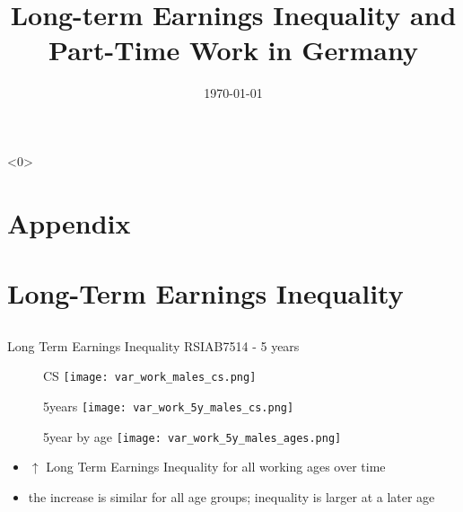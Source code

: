 \documentclass[hyperref={bookmarks=false}]{beamer}
\title{Long-term Earnings Inequality and Part-Time Work in Germany}
\author[Short Name (U ABC)]{%
  \texorpdfstring{%
    \begin{columns}
      \column{.5\linewidth}
      \centering
Manuel Sanchez
    \end{columns}
 }
{Author 1}
}
\institute{University of Bristol}
\date{\today}
\let\oldcite=\cite
\renewcommand{\cite}[1]{\textcolor[rgb]{.0,.2,.7}{\oldcite{#1}}}
\begin{document}
\begin{frame}
\titlepage
\end{frame}



\begin{frame}<0>
\addtocounter{framenumber}{-1} 
\scriptsize


\end{frame}

\begin{appendix}

\section{Appendix}
\subsection{}


\section{Long-Term Earnings Inequality}
\subsection{}
\begin{frame}
\label{EI}
\end{frame}

\begin{frame}{Long Term Earnings Inequality RSIAB7514 - 5 years}
\begin{figure}[!t]
\centering
\begin{minipage}[b]{0.3\textwidth}{CS}
\centering
\texttt{[image: var\_work\_males\_cs.png]}
\end{minipage}
\begin{minipage}[b]{0.3\textwidth}{5years}
\centering
\texttt{[image: var\_work\_5y\_males\_cs.png]}
\end{minipage}
\begin{minipage}[b]{0.3\textwidth}{5year by age}
	\centering
	\texttt{[image: var\_work\_5y\_males\_ages.png]}
\end{minipage}
\end{figure}
\begin{itemize}
\setlength{\itemsep}{0.7 cm}
\item $\uparrow$ Long Term Earnings Inequality for all working ages over time \cite{BoCo15}
\item the increase is similar for all age groups; inequality is larger at a later age
\end{itemize}
\end{frame}


\end{appendix}
\end{document}
